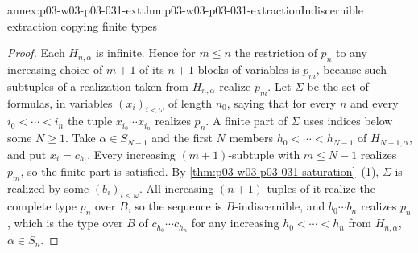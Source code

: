 \begin{annexitem}{annex:p03-w03-p03-031-ext}{thm:p03-w03-p03-031-extraction}{Indiscernible extraction copying finite types}
\begin{proof}
Each \(H_{n,\alpha}\) is infinite.  Hence for \(m\leq n\) the restriction of
\(p_n\) to any increasing choice of \(m+1\) of its \(n+1\) blocks of
variables is \(p_m\), because such subtuples of a realization taken from
\(H_{n,\alpha}\) realize \(p_m\).  Let \(\Sigma\) be the set of formulas, in
variables \((x_i)_{i<\omega}\) of length \(n_0\), saying that for every
\(n\) and every \(i_0<\cdots<i_n\) the tuple
\(x_{i_0}\cdots x_{i_n}\) realizes \(p_n\).  A finite part of
\(\Sigma\) uses indices below some \(N\geq1\).  Take \(\alpha\in S_{N-1}\)
and the first \(N\) members \(h_0<\cdots<h_{N-1}\) of \(H_{N-1,\alpha}\),
and put \(x_i=c_{h_i}\).  Every increasing \((m+1)\)-subtuple with
\(m\leq N-1\) realizes \(p_m\), so the finite part is satisfied.
By \cref{thm:p03-w03-p03-031-saturation}~(1), \(\Sigma\) is realized by
some \((b_i)_{i<\omega}\).  All increasing \((n+1)\)-tuples of it realize
the complete type \(p_n\) over \(B\), so the sequence is
\(B\)-indiscernible, and \(b_0\cdots b_n\) realizes \(p_n\), which is the
type over \(B\) of \(c_{h_0}\cdots c_{h_n}\) for any increasing
\(h_0<\cdots<h_n\) from \(H_{n,\alpha}\), \(\alpha\in S_n\).
\end{proof}
\end{annexitem}

